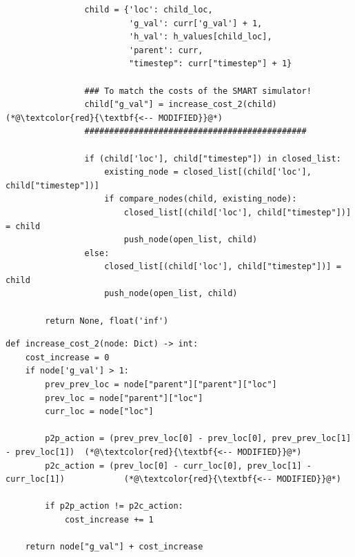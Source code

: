 \documentclass[11pt]{article}
\begin{document}
\begin{lstlisting}
                child = {'loc': child_loc,
                         'g_val': curr['g_val'] + 1,
                         'h_val': h_values[child_loc],
                         'parent': curr,
                         "timestep": curr["timestep"] + 1}

                ### To match the costs of the SMART simulator!
                child["g_val"] = increase_cost_2(child)  (*@\textcolor{red}{\textbf{<-- MODIFIED}}@*)
                #############################################

                if (child['loc'], child["timestep"]) in closed_list:
                    existing_node = closed_list[(child['loc'], child["timestep"])]
                    if compare_nodes(child, existing_node):
                        closed_list[(child['loc'], child["timestep"])] = child
                        push_node(open_list, child)
                else:
                    closed_list[(child['loc'], child["timestep"])] = child
                    push_node(open_list, child)

        return None, float('inf')
    \end{lstlisting}

    \begin{lstlisting}
def increase_cost_2(node: Dict) -> int:
    cost_increase = 0
    if node['g_val'] > 1:
        prev_prev_loc = node["parent"]["parent"]["loc"]
        prev_loc = node["parent"]["loc"]
        curr_loc = node["loc"]

        p2p_action = (prev_prev_loc[0] - prev_loc[0], prev_prev_loc[1] - prev_loc[1])  (*@\textcolor{red}{\textbf{<-- MODIFIED}}@*)
        p2c_action = (prev_loc[0] - curr_loc[0], prev_loc[1] - curr_loc[1])            (*@\textcolor{red}{\textbf{<-- MODIFIED}}@*)

        if p2p_action != p2c_action:
            cost_increase += 1

    return node["g_val"] + cost_increase
    \end{lstlisting}
\end{document}
